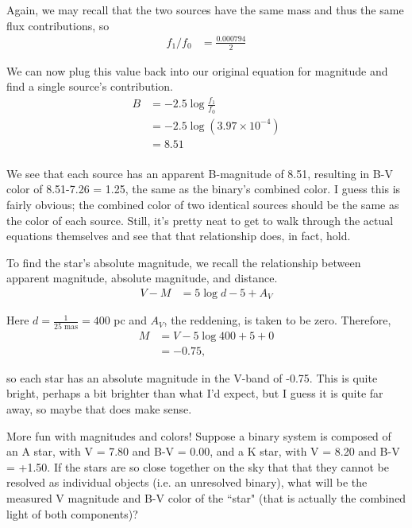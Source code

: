 \documentclass[12pt]{article}
\newenvironment{problem}[2][Problem]{\begin{trivlist}
\item[\hskip \labelsep {\bfseries #1}\hskip \labelsep {\bfseries #2.}]}{\end{trivlist}}
\newenvironment{answer}[2][Answer]{\begin{trivlist}
\item[\hskip \labelsep {\bfseries #1}\hskip \labelsep {\bfseries #2.}]}{\end{trivlist}}
\begin{document}
\begin{answer}{4}
Again, we may recall that the two sources have the same mass and thus the same flux contributions, so
\begin{align*}
f_1/f_0 &= \frac{0.000794}{2}
\end{align*}

We can now plug this value back into our original equation for magnitude and find a single source's contribution.
\begin{align*}
B &= -2.5 \log{\frac{f_1}{f_0}} \\
  &= -2.5 \log{(3.97 \times 10^{-4})} \\
  &= 8.51 \\
\end{align*}

We see that each source has an apparent B-magnitude of 8.51, resulting in B-V color of 8.51-7.26 = 1.25, the same as the binary's combined color. I guess this is fairly obvious; the combined color of two identical sources should be the same as the color of each source. Still, it's pretty neat to get to walk through the actual equations themselves and see that that relationship does, in fact, hold.

To find the star's absolute magnitude, we recall the relationship between apparent magnitude, absolute magnitude, and distance.
\begin{align*}
  V - M &= 5 \log{d} - 5 + A_V
\end{align*}

Here $d = \frac{1}{25 \text{ mas}} = 400$ pc and $A_V$, the reddening, is taken to be zero. Therefore,
\begin{align*}
  M &= V - 5 \log{400} + 5 + 0 \\
    &= -0.75,
\end{align*}

so each star has an absolute magnitude in the V-band of -0.75. This is quite bright, perhaps a bit brighter than what I'd expect, but I guess it is quite far away, so maybe that does make sense.








\end{answer}







\begin{problem}{5}
More fun with magnitudes and colors! Suppose a binary system is composed of an A star, with V = 7.80 and B-V = 0.00, and a K star, with V = 8.20 and B-V = +1.50. If the stars are so close together on the sky that that they cannot be resolved as individual objects (i.e. an unresolved binary), what will be the measured V magnitude and B-V color of the ``star" (that is actually the combined light of both components)?
\end{problem}
\end{document}
